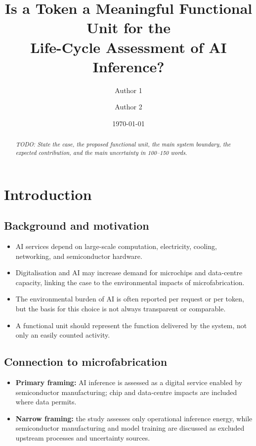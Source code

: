 \documentclass[11pt,a4paper]{article}
\title{Is a Token a Meaningful Functional Unit for the\\
Life-Cycle Assessment of AI Inference?}
\author{Author 1 \and Author 2}
\date{\today}
\begin{document}
\maketitle

\begin{abstract}
\textit{TODO: State the case, the proposed functional unit, the main system
boundary, the expected contribution, and the main uncertainty in 100--150
words.}
\end{abstract}

\tableofcontents

\section{Introduction}

\subsection{Background and motivation}
\begin{itemize}[leftmargin=*]
    \item AI services depend on large-scale computation, electricity, cooling,
    networking, and semiconductor hardware.
    \item Digitalisation and AI may increase demand for microchips and data-centre
    capacity, linking the case to the environmental impacts of microfabrication.
    \item The environmental burden of AI is often reported per request or per
    token, but the basis for this choice is not always transparent or comparable.
    \item A functional unit should represent the function delivered by the system,
    not only an easily counted activity.
\end{itemize}

\subsection{Connection to microfabrication}
\begin{itemize}[leftmargin=*]
    \item \textbf{Primary framing:} AI inference is assessed as a digital service
    enabled by semiconductor manufacturing; chip and data-centre impacts are
    included where data permits.
    \item \textbf{Narrow framing:} the study assesses only operational inference
    energy, while semiconductor manufacturing and model training are discussed as
    excluded upstream processes and uncertainty sources.
\end{itemize}
\end{document}
